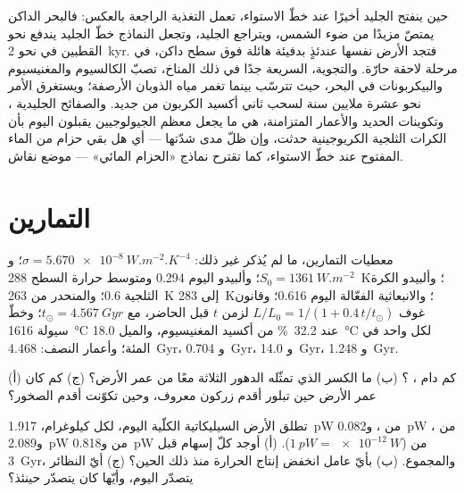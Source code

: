 حين ينفتح الجليد أخيرًا عند خطّ الاستواء، تعمل التغذية الراجعة بالعكس: فالبحر الداكن يمتصّ مزيدًا من
ضوء الشمس، ويتراجع الجليد، وتجعل النماذج خطّ الجليد يندفع نحو القطبين في نحو
\qty{2}{kyr}. فتجد الأرض نفسها عندئذٍ بدفيئة هائلة فوق سطح داكن، في مرحلة لاحقة
حارّة. والتجوية، السريعة جدًا في ذلك المناخ، تصبّ الكالسيوم والمغنيسيوم والبيكربونات في
البحر، حيث تترسّب  بينما تغمر مياه الذوبان الأرصفة؛ ويستغرق الأمر
نحو عشرة ملايين سنة لسحب ثاني أكسيد الكربون من جديد. والصفائح الجليدية ، وتكوينات الحديد والأعمار المتزامنة، هي ما يجعل معظم الجيولوجيين يقبلون اليوم
بأن الكرات الثلجية الكريوجينية حدثت، وإن ظلّ مدى شدّتها --- أي هل بقي حزام من الماء
المفتوح عند خطّ الاستواء، كما تقترح نماذج «الحزام المائي» --- موضع نقاش.

\section*{التمارين}\label{sec:b2:precambrian-earth:exercises}

معطيات التمارين، ما لم يُذكر غير ذلك: $\sigma = \qty{5.670e-8}{W.m^{-2}.K^{-4}}$؛
و$S_0 = \qty{1361}{W.m^{-2}}$؛ وألبيدو اليوم 0.294 ومتوسط حرارة السطح \qty{288}{K}؛
وألبيدو الكرة الثلجية 0.6؛ والمنحدر من \qty{263}{K} إلى \qty{283}{K}؛ والانبعاثية الفعّالة اليوم
0.616؛ وقانون غوف $L/L_0 = 1/(1 + 0.4\,t/t_\odot)$ لزمن $t$ قبل الحاضر، مع $t_\odot =
\qty{4.567}{Gyr}$؛ وخطّ سيولة  \qty{1616}{\celsius} عند \qty{32.2}{\percent} من أكسيد المغنيسيوم،
والميل \qty{18.0}{\celsius} لكل واحد في المئة؛ وأعمار النصف:  \qty{4.468}{Gyr}، و
\qty{0.704}{Gyr}، و \qty{14.0}{Gyr}، و \qty{1.248}{Gyr}.

\begin{exercise}[$\star$]\label{exo:b2:precambrian-earth:1}
(أ) كم دام ،  ؟ (ب) ما الكسر الذي تمثّله الدهور الثلاثة معًا من عمر
الأرض؟ (ج) كم كان عمر الأرض حين تبلور أقدم زركون معروف، وحين
تكوّنت أقدم الصخور؟
\end{exercise}

\begin{exercise}[$\star$]\label{exo:b2:precambrian-earth:2}
تطلق الأرض السيليكاتية الكلّية اليوم، لكل كيلوغرام، \qty{1.917}{pW} من ،
و\qty{0.082}{pW} من ، و\qty{2.089}{pW} من  و\qty{0.818}{pW} من
 ($\qty{1}{pW} = \qty{e-12}{W}$). (أ) أوجد كلّ إسهام قبل \qty{3}{Gyr}،
والمجموع. (ب) بأيّ عامل انخفض إنتاج الحرارة منذ ذلك الحين؟ (ج) أيّ النظائر يتصدّر
اليوم، وأيّها كان يتصدّر حينئذ؟
\end{exercise}

